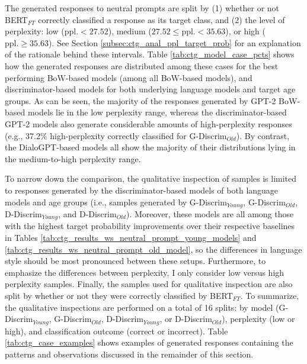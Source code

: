 The generated responses to neutral prompts are split by (1) whether or not BERT$_{FT}$ correctly classified a response as its target class, and (2) the level of perplexity: low ($\text{ppl.} < 27.52$), medium ($27.52 \leq \text{ppl.} < 35.63$), or high ($\text{ppl.} \geq 35.63$). See Section \ref{subsec:ctg_anal_ppl_target_prob} for an explanation of the rationale behind these intervals. Table \ref{tab:ctg_model_case_pcts} shows how the generated responses are distributed among these cases for the best performing BoW-based models (among all BoW-based models), and discriminator-based models for both underlying language models and target age groups. As can be seen, the majority of the responses generated by GPT-2 BoW-based models lie in the low perplexity range, whereas the discriminator-based GPT-2 models also generate considerable amounts of high-perplexity responses (e.g., 37.2\% high-perplexity correctly classified for G-Discrim$_{Old}$). By contrast, the DialoGPT-based models all show the majority of their distributions lying in the medium-to-high perplexity range.

To narrow down the comparison, the qualitative inspection of samples is limited to responses generated by the discriminator-based models of both language models and age groups (i.e., samples generated by G-Discrim$_{Young}$, G-Discrim$_{Old}$, D-Discrim$_{Young}$, and D-Discrim$_{Old}$). Moreover, these models are all among those with the highest target probability improvements over their respective baselines in Tables \ref{tab:ctg_results_ws_neutral_prompt_young_models} and \ref{tab:ctg_results_ws_neutral_prompt_old_model}, so the differences in language style should be most pronounced between these setups. Furthermore, to emphasize the differences between perplexity, I only consider low versus high perplexity samples. Finally, the samples used for qualitative inspection are also split by whether or not they were correctly classified by BERT$_{FT}$. To summarize, the qualitative inspections are performed on a total of 16 splits: by model (G-Discrim$_{Young}$, G-Discrim$_{Old}$, D-Discrim$_{Young}$, or D-Discrim$_{Old}$), perplexity (low or high), and classification outcome (correct or incorrect). Table \ref{tab:ctg_case_examples} shows examples of generated responses containing the patterns and observations discussed in the remainder of this section.

